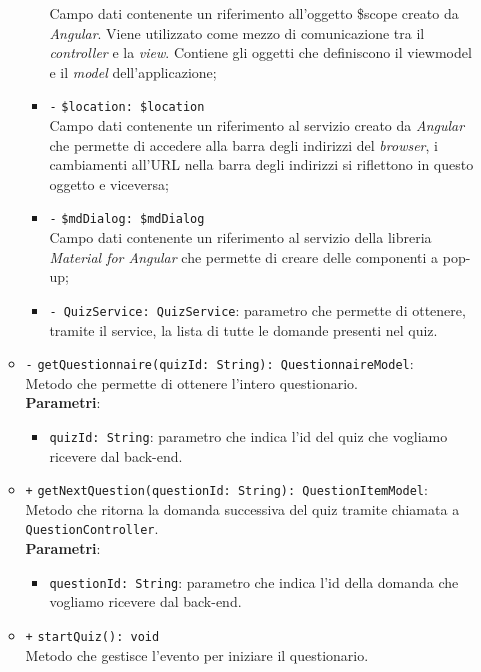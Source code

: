 \begin{itemize}
\begin{itemize}
\begin{itemize}
			Campo dati contenente un riferimento all'oggetto \$scope creato da \textit{Angular}. Viene utilizzato come mezzo di comunicazione tra il \textit{controller} e la \textit{view}. Contiene gli oggetti che definiscono il viewmodel e il \textit{model} dell'applicazione;
			\item \texttt{-} \texttt{\$location: \$location} \\
			Campo dati contenente un riferimento al servizio creato da \textit{Angular} che permette di accedere alla barra degli indirizzi del \textit{browser}, i cambiamenti all’URL nella barra degli indirizzi si riflettono in questo oggetto e viceversa;
			\item \texttt{-} \texttt{\$mdDialog: \$mdDialog} \\
			Campo dati contenente un riferimento al servizio della libreria \textit{Material for Angular} che permette di creare delle componenti a pop-up;
			\item \texttt{- QuizService: QuizService}: parametro che permette di ottenere, tramite il service, la lista di tutte le domande presenti nel quiz.
		\end{itemize}
		\item \texttt{-} \texttt{getQuestionnaire(quizId: String): QuestionnaireModel}: \\ Metodo che permette di ottenere l'intero questionario. \\
		\textbf{Parametri}:
		\begin{itemize}
			\item \texttt{quizId: String}: parametro che indica l'id del quiz che vogliamo ricevere dal back-end.
		\end{itemize}
		\item \texttt{+} \texttt{getNextQuestion(questionId: String): QuestionItemModel}: \\ Metodo che ritorna la domanda successiva del quiz tramite chiamata a \texttt{QuestionController}. \\
		\textbf{Parametri}:
		\begin{itemize}
			\item \texttt{questionId: String}: parametro che indica l'id della domanda che vogliamo ricevere dal back-end.
		\end{itemize}
		\item \texttt{+} \texttt{startQuiz(): void} \\
		Metodo che gestisce l'evento per iniziare il questionario. 
	\end{itemize}
\end{itemize}

